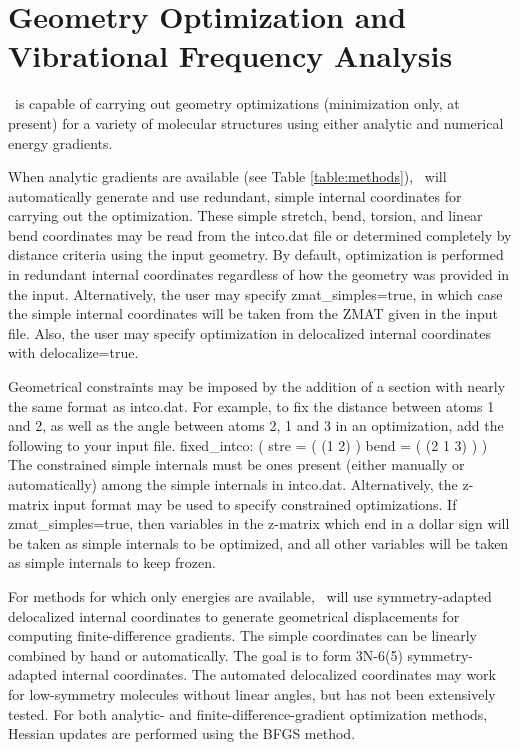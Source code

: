 \section{Geometry Optimization and Vibrational Frequency Analysis} \label{opt}

\PSIthree\ is capable of carrying out geometry optimizations (minimization
only, at present) for a variety of molecular structures using either analytic
and numerical energy gradients.  

When analytic gradients are available (see Table \ref{table:methods}),
\PSIthree\ will automatically generate and use redundant, simple internal
coordinates for carrying out the optimization.  These simple stretch, bend,
torsion, and linear bend coordinates may be read from the intco.dat file
or determined completely by distance criteria using the input geometry.
By default, optimization is performed in redundant internal coordinates
regardless of how the geometry was provided in the input.  Alternatively,
the user may specify zmat\_simples=true, in which case the simple internal
coordinates will be taken from the ZMAT given in the input file.  Also,
the user may specify optimization in delocalized internal coordinates
with delocalize=true.  

Geometrical constraints may be imposed by the addition of a section
with nearly the same format as intco.dat.  For example, to fix the distance
between atoms 1 and 2, as well as the angle between atoms 2, 1 and 3
in an optimization, add the following to your input file.
fixed\_intco: (
  stre = (
    (1 2)
  )
  bend = (
    (2 1 3)
  )
)
The constrained simple internals must be ones present (either manually or
automatically) among the simple internals in intco.dat.  Alternatively,
the z-matrix input format may be used to specify constrained optimizations.
If zmat\_simples=true, then variables in the z-matrix which end in
a dollar sign will be taken as simple internals to be optimized, and
all other variables will be taken as simple internals to keep frozen.

For methods for which only energies are available, \PSIthree\ will use
symmetry-adapted delocalized internal coordinates to generate geometrical
displacements for computing finite-difference gradients. The simple
coordinates can be linearly combined by hand or automatically.  The goal
is to form 3N-6(5) symmetry-adapted internal coordinates.  The automated
delocalized coordinates may work for low-symmetry molecules without
linear angles, but has not been extensively tested.  For both analytic-
and finite-difference-gradient optimization methods, Hessian updates are
performed using the BFGS method.

